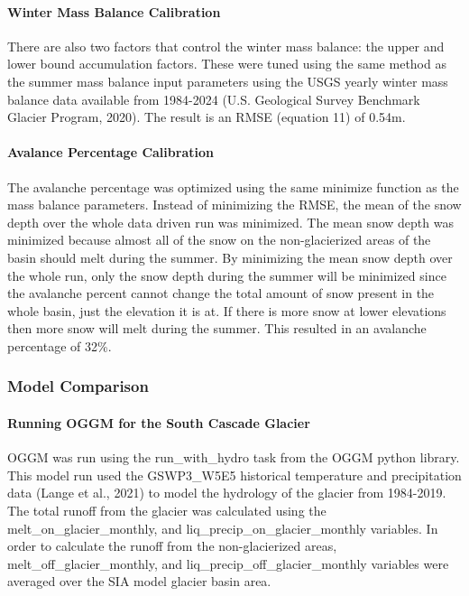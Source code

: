 \documentclass{article}
\begin{document}
\paragraph{Winter Mass Balance Calibration}
There are also two factors that control the winter mass balance: the upper and lower bound accumulation factors. These were tuned using the same 
method as the summer mass balance input parameters using the USGS yearly winter mass balance data available from 1984-2024 (U.S. Geological Survey Benchmark Glacier Program, 2020). 
The result is an RMSE (equation 11) of 0.54m.

\paragraph{Avalance Percentage Calibration}
The avalanche percentage was optimized using the same minimize function as the mass balance parameters. Instead of minimizing the RMSE, the mean of the 
snow depth over the whole data driven run was minimized. The mean snow depth was minimized because almost all of the snow on the 
non-glacierized areas of the basin should melt during the summer. By minimizing the mean snow depth over the whole run, only the snow depth during 
the summer will be minimized since the avalanche percent cannot change the total amount of snow present in the whole basin, just the elevation it is at. If 
there is more snow at lower elevations then more snow will melt during the summer. This resulted in an avalanche percentage of 32\%.

\subsubsection{Model Comparison}
\paragraph{Running OGGM for the South Cascade Glacier}
OGGM was run using the run\_with\_hydro task from the OGGM python library. This model run used the GSWP3\_W5E5 historical temperature and 
precipitation data (Lange et al., 2021) to model the hydrology of the glacier from 1984-2019. The total runoff from the glacier was calculated 
using the melt\_on\_glacier\_monthly, and liq\_precip\_on\_glacier\_monthly variables. In order 
to calculate the runoff from the non-glacierized areas, melt\_off\_glacier\_monthly, and liq\_precip\_off\_glacier\_monthly variables were averaged over the 
SIA model glacier basin area. 
\end{document}
